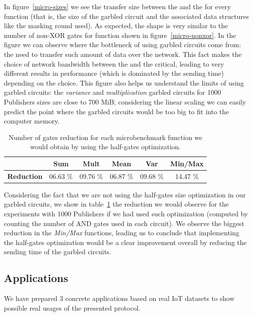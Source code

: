In figure~\ref{micro-sizes} we see the transfer size between the \broker and
the \garbler for every function (that is, the size of the garbled circuit and
the associated data structures like the masking round used).  As expected, the
shape is very similar to the number of non-XOR gates for function shown in
figure~\ref{micro-nonxor}.  In the figure we can observe where the bottleneck
of using garbled circuits come from: the need to transfer such amount of data
over the network.  This fact makes the choice of network bandwidth between the
\broker and the \garbler critical, leading to very different results in
performance (which is dominated by the sending time) depending on the choice.
This figure also helps us understand the limits of using garbled circuits: the
\emph{variance} and \emph{multiplication} garbled circuits for 1000 Publishers
sizes are close to 700 MiB; considering the linear scaling we can easily
predict the point where the garbled circuits would be too big to fit into the
computer memory.

\begin{table}
    \begin{tabular}{l|*{4}{c}c}
      & \textbf{Sum} & \textbf{Mult} & \textbf{Mean} & \textbf{Var} & \textbf{Min/Max} \\
    \hline
    \textbf{Reduction} & 06.63 \% & 09.76 \% & 06.87 \% & 09.68 \% & 14.47 \% \\
    \end{tabular}
    \caption{Number of gates reduction for each microbenchmark function we
      would obtain by using the half-gates optimization.}
    \label{micro-and}
\end{table}

Considering the fact that we are not using the half-gates size optimization in
our garbled circuits, we show in table~\ref{micro-and} the reduction we would
observe for the experiments with 1000 Publishers if we had used such
optimization (computed by counting the number of AND gates used in each
circuit).  We observe the biggest reduction in the \emph{Min/Max} functions,
leading us to conclude that implementing the half-gates optimization would be a
clear improvement overall by reducing the sending time of the garbled circuits.

\subsection{Applications}

We have prepared 3 concrete applications based on real IoT datasets to show
possible real usages of the presented protocol.

